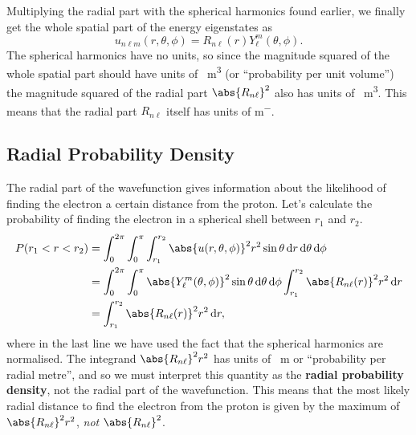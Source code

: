 \documentclass[../quantum_mechanics.tex]{subfiles}
\begin{document}
            Multiplying the radial part with the spherical harmonics found earlier, we finally get the whole spatial part of the energy eigenstates as
            \begin{equation}
                u_{n\ell m}(r,\theta,\phi)=R_{n\ell}(r)Y_\ell^m(\theta,\phi).
            \end{equation}
            The spherical harmonics have no units, so since the magnitude squared of the whole spatial part should have units of \unit{\per\meter\cubed} (or ``probability per unit volume'') the magnitude squared of the radial part $\abs{R_{n\ell}}^2$ also has units of \unit{\per\meter\cubed}.
            This means that the radial part $R_{n\ell}$ itself has units of \unit{\meter\tothe{-}}.

        \subsection{Radial Probability Density}\label{sec:solving-the-hydrogen-atom:subsec:radial-probability-density}
            The radial part of the wavefunction gives information about the likelihood of finding the electron a certain distance from the proton.
            Let's calculate the probability of finding the electron in a spherical shell between $r_1$ and $r_2$.
            \begin{align}
                P(r_1<r<r_2)&=\int_0^{2\pi}\int_0^\pi\int_{r_1}^{r_2}\abs{u(r,\theta,\phi)}^2r^2\sin\theta\dd{r}\dd{\theta}\dd{\phi}\\
                &=\int_0^{2\pi}\int_0^\pi\abs{Y_\ell^m(\theta,\phi)}^2\sin\theta\dd{\theta}\dd{\phi}\int_{r_1}^{r_2}\abs{R_{n\ell}(r)}^2r^2\dd{r}\\
                &=\int_{r_1}^{r_2}\abs{R_{n\ell}(r)}^2r^2\dd{r},
            \end{align}
            where in the last line we have used the fact that the spherical harmonics are normalised.
            The integrand $\abs{R_{n\ell}}^2r^2$ has units of \unit{\per\meter} or ``probability per radial metre'', and so we must interpret this quantity as the \textbf{radial probability density}, not the radial part of the wavefunction.
            This means that the most likely radial distance to find the electron from the proton is given by the maximum of $\abs{R_{n\ell}}^2r^2$, \textit{not} $\abs{R_{n\ell}}^2$.
\end{document}
